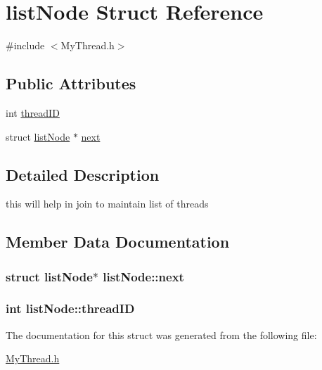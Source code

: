 \hypertarget{structlist_node}{\section{list\+Node Struct Reference}
\label{structlist_node}
}


{\ttfamily \#include $<$My\+Thread.\+h$>$}

\subsection*{Public Attributes}
\begin{DoxyCompactItemize}
\item 
int \hyperlink{structlist_node_a3bed262a70e29e08c3091aa0beff2888}{thread\+I\+D}
\item 
struct \hyperlink{structlist_node}{list\+Node} $\ast$ \hyperlink{structlist_node_a860785ea27fb1c044d6a59ba491dd6ab}{next}
\end{DoxyCompactItemize}


\subsection{Detailed Description}
this will help in join to maintain list of threads 

\subsection{Member Data Documentation}
\hypertarget{structlist_node_a860785ea27fb1c044d6a59ba491dd6ab}{
\subsubsection[{next}]{\setlength{\rightskip}{0pt plus 5cm}struct {\bf list\+Node}$\ast$ list\+Node\+::next}}\label{structlist_node_a860785ea27fb1c044d6a59ba491dd6ab}
\hypertarget{structlist_node_a3bed262a70e29e08c3091aa0beff2888}{
\subsubsection[{thread\+I\+D}]{\setlength{\rightskip}{0pt plus 5cm}int list\+Node\+::thread\+I\+D}}\label{structlist_node_a3bed262a70e29e08c3091aa0beff2888}


The documentation for this struct was generated from the following file\+:\begin{DoxyCompactItemize}
\item 
\hyperlink{_my_thread_8h}{My\+Thread.\+h}\end{DoxyCompactItemize}

